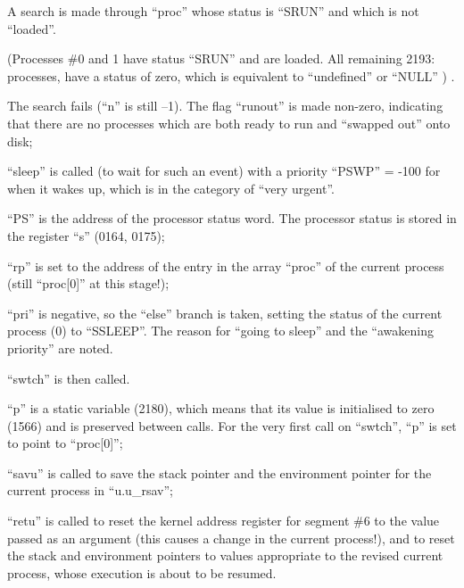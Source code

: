 \bd
\item[1960:] A search is made through ``proc''
 whose status is
``SRUN'' and which is not ``loaded''.
\ed

(Processes \#0 and 1 have status ``SRUN''
and are loaded. All remaining 2193:
processes, have a status of zero, which
is equivalent to ``undefined'' or 
``NULL'' ) .

\bd
\item[1966:] The search fails (``n'' is still
 --1). The flag ``runout'' is made
 non-zero, indicating that there
 are no processes which are both
 ready to run and ``swapped out''
 onto disk;

\item[1968:] ``sleep'' is called (to wait for
 such an event) with a priority
 ``PSWP'' = -100 for when it
 wakes up, which is in the
 category of ``very urgent''.
\ed


\bd
\item[2070:] ``PS'' is the address of the processor status word. The processor
 status is stored in the register
 ``s'' (0164, 0175);

\item[2071:] ``rp'' is set to the address of the
 entry in the array ``proc'' of the
 current process (still ``proc[0]''
 at this stage!);

\item[2072:] ``pri'' is negative, so the ``else''
 branch is taken, setting the
 status of the current process
 (0) to ``SSLEEP''. The reason for
 ``going to sleep'' and the ``awakening priority'' are noted.

\item[2093:] ``swtch'' is then called.
\ed


\bd
\item[2184:] ``p'' is a static variable (2180),
 which means that its value is
 initialised to zero (1566) and is
 preserved between calls. For the
 very first call on ``swtch'', ``p''
 is set to point to ``proc[0]'';

\item[2189:] ``savu'' is called to save the
stack pointer and the environment
pointer for the current process
in ``u.u\_rsav'';

\item[2193:] ``retu'' is called
to reset the kernel address
register for segment \#6 to the
value passed as an argument
(this causes a change in the
current process!), and
 to reset the stack and environment pointers to values
 appropriate to the revised
 current process, whose execution
 is about to be resumed.
\ed

